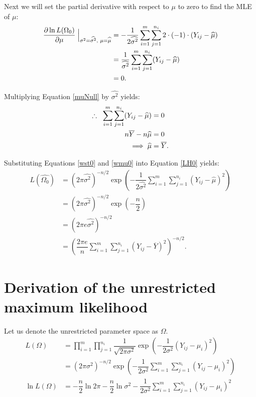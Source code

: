\documentclass[12pt,a4paper,openright]{article}
\newcommand{\eqn}[1]{Equation \ref{#1}}
\newcommand{\ovY}{\overline{Y}}
\newcommand{\wmu}{\widehat{\mu}}
\newcommand{\wst}{\widehat{\sigma^2}}
\begin{document}
	Next we will set the partial derivative with respect to $\mu$ to zero to find the MLE of $\mu$:
	\begin{align}
		\dfrac{\partial \ln{L(\Omega_0)}}{\partial \mu} \Bigm\lvert_{\sigma^2 = \wst, \hspace{0.1cm}\mu=\wmu} &= -\dfrac{1}{2\wst} \sum_{i=1}^m \sum_{j=1}^{n_i} 2\cdot (-1)\cdot (Y_{ij}-\wmu) \nonumber\\
		&= \dfrac{1}{\wst} \sum_{i=1}^m \sum_{j=1}^{n_i} (Y_{ij}-\wmu) \nonumber\\
		&= 0. \label{muNull}
	\end{align}

	Multiplying \eqn{muNull} by $\wst$ yields:
	\begin{align}
		\therefore \hspace{0.2cm} \sum_{i=1}^m \sum_{j=1}^{n_i} (Y_{ij}-\wmu) &= 0 \nonumber\\
		n\ovY - n\wmu &= 0 \nonumber \\
		\implies \wmu &= \ovY. \label{wmu0}
	\end{align}

	Substituting Equations \ref{wst0} and \ref{wmu0} into \eqn{LH0} yields:
	\begin{align}
		L(\widehat{\Omega_0}) &= (2\pi\wst)^{-n/2} \exp{\left(-\dfrac{1}{2\wst} \sum_{i=1}^m \sum_{j=1}^{n_i} (Y_{ij}-\wmu)^2\right)} \nonumber\\
		&= (2\pi \wst)^{-n/2} \exp\left(-\dfrac{n}{2}\right) \nonumber \\
		&= (2\pi e\wst)^{-n/2} \nonumber \\
		&= \left(\dfrac{2\pi e}{n} \sum_{i=1}^m \sum_{j=1}^{n_i} (Y_{ij}-\ovY)^2\right)^{-n/2}.\label{MLE0}
	\end{align}

	\section{Derivation of the unrestricted maximum likelihood}
	Let us denote the unrestricted parameter space as $\Omega$.
	\begin{align}
		L(\Omega) &= \prod_{i=1}^m \prod_{j=1}^{n_i} \dfrac{1}{\sqrt{2\pi \sigma^2}} \exp{\left(-\dfrac{1}{2\sigma^2} (Y_{ij}-\mu_i)^2\right)} \nonumber\\
		&= (2\pi \sigma^2)^{-n/2} \exp{\left(-\dfrac{1}{2\sigma^2}\sum_{i=1}^m \sum_{j=1}^{n_i} (Y_{ij}-\mu_i)^2\right)} \label{Lu}\\
		\ln{L(\Omega)} &= -\dfrac{n}{2}\ln{2\pi} - \dfrac{n}{2} \ln{\sigma^2} - \dfrac{1}{2\sigma^2} \sum_{i=1}^m \sum_{j=1}^{n_i} (Y_{ij}-\mu_i)^2 \nonumber
	\end{align}
\end{document}

